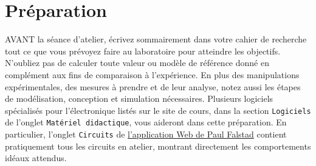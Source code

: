 \documentclass[canadien,12pt,oneside,letterpaper]{article}
\begin{document}


\section{Préparation}\label{sec:prep}

AVANT la séance d'atelier, écrivez sommairement dans votre cahier de recherche tout ce que vous prévoyez faire au laboratoire pour atteindre les objectifs. N'oubliez pas de calculer toute valeur ou modèle de référence donné en complément aux fins de comparaison à l'expérience. En plus des manipulations expérimentales, des mesures à prendre et de leur analyse, notez aussi les étapes de modélisation, conception et simulation nécessaires. Plusieurs logiciels spécialisés pour l'électronique listés sur le site de cours, dans la section \texttt{Logiciels} de l'onglet \texttt{Matériel didactique}, vous aideront dans cette préparation. En particulier, l'onglet \texttt{Circuits} de \href{https://www.falstad.com/circuit/}{l'application Web de Paul Falstad} contient pratiquement tous les circuits en atelier, montrant directement les comportements idéaux attendus.%
\end{document}
